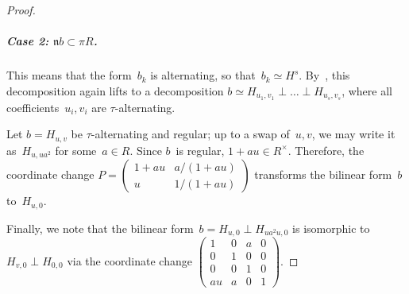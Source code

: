 \documentclass{lms}
\let\fr\mathfrak
\def\mat#1{\begin{pmatrix}#1\end{pmatrix}}
\begin{document}
\begin{proof}
\subparagraph{Case 2: $\fr n b ⊂ π R$.}
This means that the form~$b_k$ is alternating, so that~$b_k ≃ H^s$.
By~\cite[Corollary 3.4]{baeza1978quadratic}, this decomposition again lifts to a
decomposition $b ≃ H_{u_1, v_1} ⟂ … ⟂ H_{u_s, v_s}$, where all
coefficients~$u_i, v_i$ are $τ$-alternating.

Let $b = H_{u,v}$ be $τ$-alternating and regular; up to a swap of~$u, v$, we
may write it as~$H_{u, u a^2}$ for some~$a ∈ R$. Since $b$~is
regular, $1 + a u ∈ R^{×}$. Therefore, the coordinate
change $P = \mat{1+a u & a/(1+a u) \\ u & 1/(1+a u)}$ transforms the
bilinear form~$b$ to~$H_{u, 0}$.

Finally, we note that the bilinear form~$b = H_{u, 0} ⟂ H_{u a^2 u, 0}$ is
isomorphic to~$H_{v, 0} ⟂ H_{0,0}$ via the coordinate change
$\mat{1 & 0 & a & 0\\0&1&0&0\\0&0&1&0\\au & a & 0 & 1}$.
\end{proof}
\end{document}
